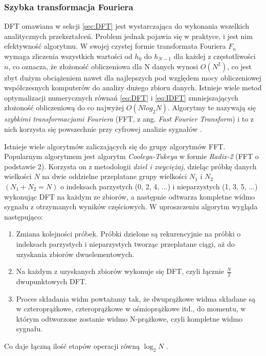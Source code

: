 \documentclass[12pt,a4paper,twoside]{mwart}
\begin{document}
\subsubsection{Szybka transformacja Fouriera} \label{sec:FFT}
DFT omawiana w sekcji \ref{sec:DFT} jest wystarczająca do wykonania wszelkich analitycznych przekształceń. Problem jednak pojawia się w praktyce, i jest nim efektywność algorytmu. W swojej czystej formie transformata Fouriera $F_n$ wymaga zliczenia wszystkich wartości od $h_0$ do $h_{N-1}$ dla każdej z częstotliwości $n$, co oznacza, że złożoność obliczeniowa dla N danych wynosi $O(N^2)$, co jest zbyt dużym obciążeniem nawet dla najlepszych pod względem mocy obliczeniowej współczesnych komputerów do analizy dużego zbioru danych. Istnieje wiele metod optymalizacji numerycznych równań \ref{eq:DFT} i \ref{eq:IDFT} zmniejszających złożoność obliczeniową do co najwyżej $O(N log_2 N)$. Algorytmy te nazywają się \textit{szybkimi transformacjami Fouriera} (FFT, z ang. \textit{Fast Fourier Transform}) i to z nich korzysta się powszechnie przy cyfrowej analizie sygnałów \cite{Transcription:Tukey:FFT}.

Istnieje wiele algorytmów zaliczających się do grupy algorytmów FFT. Popularnym algorytmem jest algorytm \textit{Cooleya-Tukeya} w formie \textit{Radix-2} (FFT o podstawie 2). Korzysta on z metodologii \textit{dziel i zwyciężaj}, dzieląc próbkę danych wielkości $N$ na dwie oddzielne przeplatane grupy wielkości $N_1$ i $N_2$ $(N_1 + N_2 = N)$ o indeksach parzystych (0, 2, 4, ...) i nieparzystych (1, 3, 5, ...) wykonując DFT na każdym ze zbiorów, a następnie odtwarza kompletne widmo sygnału z otrzymanych wyników częściowych. W uproszczeniu algorytm wygląda następująco:
\begin{enumerate}
  \item{Zmiana kolejności próbek. Próbki dzielone są rekurencyjnie na próbki o indeksach parzystych i nieparzystych tworząc przeplatane ciągi, aż do uzyskania zbiorów dwuelementowych.}
  \item{Na każdym z uzyskanych zbiorów wykonuje się DFT, czyli łącznie $\frac{N}{2}$ dwupunktowych DFT.}
  \item{Proces składania widm powtażamy tak, że dwuprążkowe widma składane są w czteroprążkowe, czteroprążkowe w ośmioprążkowe itd., do momentu, w którym odtworzone zostanie widmo N-prążkowe, czyli kompletne widmo sygnału.}
\end{enumerate}
Co daje łączną ilość etapów operacji równą $\log_2 N$ 
\cite[241-252]{CyfrowePrzetwarzanieSygnalowOdTeoriiDoZastosowan}
.
\end{document}
